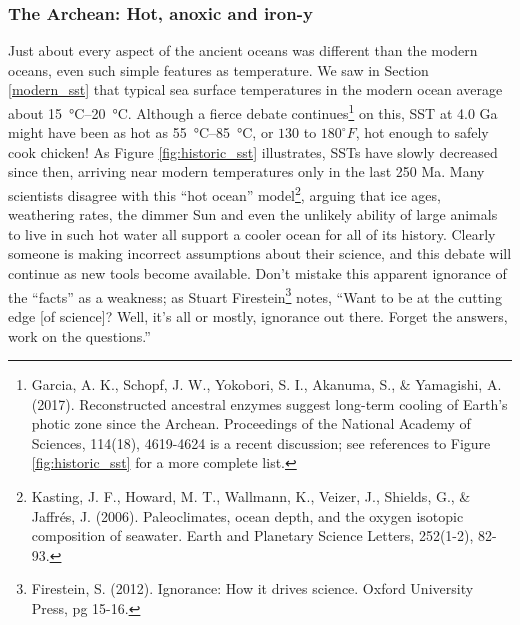 {\subsubsection{The Archean: Hot, anoxic and iron-y}
Just about every aspect of the ancient oceans was different than the modern oceans, even such simple features as temperature. We saw in Section \ref{modern_sst} that typical sea surface temperatures in the modern ocean average about \SIrange{15}{20}{\celsius}. Although a fierce debate continues\footnote{Garcia, A. K., Schopf, J. W., Yokobori, S. I., Akanuma, S., \& Yamagishi, A. (2017). Reconstructed ancestral enzymes suggest long-term cooling of Earth's photic zone since the Archean. Proceedings of the National Academy of Sciences, 114(18), 4619-4624 is a recent discussion; see references to Figure \ref{fig:historic_sst} for a more complete list.} on this, SST at 4.0 Ga might have been as hot as \SIrange{55}{85}{\celsius}, or $130$ to $180^\circ F$, hot enough to safely cook chicken! As Figure \ref{fig:historic_sst} illustrates, SSTs have slowly decreased since then, arriving near modern temperatures only in the last 250 Ma. Many scientists disagree with this ``hot ocean'' model\footnote{Kasting, J. F., Howard, M. T., Wallmann, K., Veizer, J., Shields, G., \& Jaffr\'es, J. (2006). Paleoclimates, ocean depth, and the oxygen isotopic composition of seawater. Earth and Planetary Science Letters, 252(1-2), 82-93.}, arguing that ice ages, weathering rates, the dimmer Sun and even the unlikely ability of large animals to live in such hot water all support a cooler ocean for all of its history. Clearly someone is making incorrect assumptions about their science, and this debate will continue as new tools become available. Don't mistake this apparent ignorance of the ``facts'' as a weakness; as Stuart Firestein\footnote{Firestein, S. (2012). Ignorance: How it drives science. Oxford University Press, pg 15-16.} notes, ``Want to be at the cutting edge [of science]? Well, it's all or mostly, ignorance out there. Forget the answers, work on the questions.''\\
}
